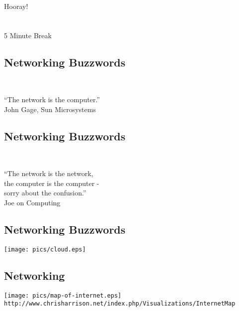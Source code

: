 \documentclass[xga]{xdvislides}
\begin{document}
\newpage
\vspace*{\fill}
\begin{center}
    \Hugesize
        Hooray! \\ [1em]
    \hspace*{5mm}
    \blueline\\
    \hspace*{5mm}\\
        5 Minute Break
\end{center}
\vspace*{\fill}

\subsection{Networking Buzzwords}
\\

\newcommand{\gargantuan}{\fontsize{45}{50}\selectfont}
\gargantuan
\begin{center}
``The network is the computer.'' \\
\small
\vspace*{.5in}
John Gage, Sun Microsystems
\end{center}
\Normalsize

\subsection{Networking Buzzwords}
\\

\gargantuan
\begin{center}
``The network is the network, \\
the computer is the computer - \\
sorry about the confusion.'' \\
\small
\vspace*{.5in}
Joe on Computing
\end{center}
\Normalsize

\subsection{Networking Buzzwords}
\vspace*{\fill}
\begin{center}
	\texttt{[image: pics/cloud.eps]}
\end{center}
\vspace*{\fill}

\subsection{Networking}
\vspace*{\fill}
\begin{center}
	\texttt{[image: pics/map-of-internet.eps]} \\
	\vspace*{\fill}
	\small
	\verb+http://www.chrisharrison.net/index.php/Visualizations/InternetMap+
	\Normalsize
\end{center}
\end{document}
